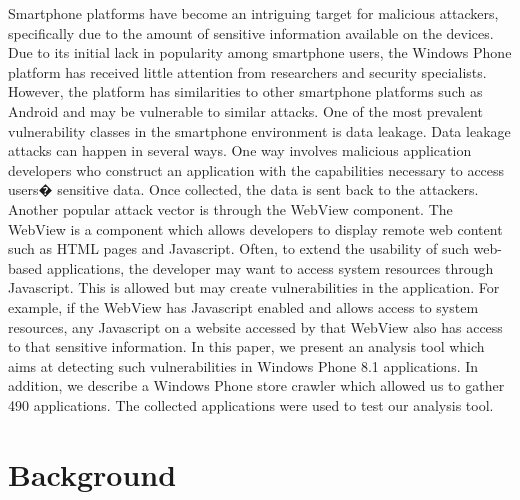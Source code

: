 \documentclass[conference]{IEEEtran}
\begin{document}
Smartphone platforms have become an intriguing target for malicious attackers, specifically due to the amount of sensitive information available on the devices.
Due to its initial lack in popularity among smartphone users, the Windows Phone platform has received little attention from researchers and security specialists. 
However, the platform has similarities to other smartphone platforms such as Android and may be vulnerable to similar attacks. 
One of the most prevalent vulnerability classes in the smartphone environment is data leakage. 
Data leakage attacks can happen in several ways. 
One way involves malicious application developers who construct an application with the capabilities necessary to access users� sensitive data.
Once collected, the data is sent back to the attackers.
Another popular attack vector is through the WebView component. 
The WebView is a component which allows developers to display remote web content such as HTML pages and Javascript. 
Often, to extend the usability of such web-based applications, the developer may want to access system resources through Javascript.
This is allowed but may create vulnerabilities in the application.
For example, if the WebView has Javascript enabled and allows access to system resources, any Javascript on a website accessed by that WebView also has access to that sensitive information. 
In this paper, we present an analysis tool which aims at detecting such vulnerabilities in Windows Phone 8.1 applications.
In addition, we describe a Windows Phone store crawler which allowed us to gather 490 applications.
The collected applications were used to test our analysis tool.

\section{Background}
\end{document}
